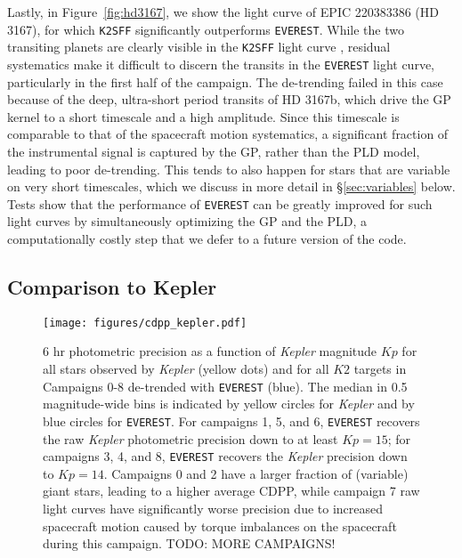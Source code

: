 \documentclass[]{emulateapj}
\newcommand{\Kp}{\ensuremath{Kp}}
\newcommand{\edited}[1]{{\color{red} #1}}
\begin{document}
\edited{Lastly, in Figure~\ref{fig:hd3167}, we show the light curve of EPIC 220383386 (HD 3167),
for which \texttt{K2SFF} significantly outperforms \texttt{EVEREST}. While the two
transiting planets are clearly visible in the \texttt{K2SFF} light curve
\citep[an ultra-short period planet at a period of 0.96 days and a planet at a period of
29.85 days;][]{Vanderburg16}, residual systematics make it difficult to discern the
transits in the \texttt{EVEREST} light curve, particularly in the first half of the
campaign. The de-trending failed in this case because of the deep, ultra-short period transits
of HD 3167b, which drive the GP kernel to a short timescale and a high amplitude. Since this
timescale is comparable to that of the spacecraft motion systematics, a significant fraction of the
instrumental signal is captured by the GP, rather than the PLD model, leading to poor
de-trending. This tends to also happen for stars that are variable on very short timescales,
which we discuss in more detail in \S\ref{sec:variables} below. Tests show that the performance
of \texttt{EVEREST} can be greatly improved for such light curves by simultaneously optimizing the
GP and the PLD, a computationally costly step that we defer to a future version of the code.}

\subsection{Comparison to Kepler}
\label{sec:kepler}

\begin{figure*}[hbt]
  \begin{center}
      \texttt{[image: figures/cdpp\_kepler.pdf]}
       \caption{6 hr photometric precision as a function of \emph{Kepler} magnitude $\Kp$ for all
       stars observed by \emph{Kepler} (yellow dots) and for all $K2$ targets in Campaigns 0-8
       de-trended with \texttt{EVEREST} (blue). The median in 0.5 magnitude-wide bins is indicated
       by yellow circles for \emph{Kepler} and by blue circles for \texttt{EVEREST}. For campaigns
       1, 5, and 6, \texttt{EVEREST} recovers the raw \emph{Kepler} photometric precision down to
       at least $\Kp = 15$; for campaigns 3, 4, and 8, \texttt{EVEREST} recovers the \emph{Kepler}
       precision down to $\Kp = 14$. Campaigns 0 and 2 have a larger fraction of (variable) giant
       stars, leading to a higher average CDPP, \edited{while campaign 7 raw light curves
       have significantly worse precision due to increased
       spacecraft motion caused by torque imbalances on the spacecraft during this campaign.
       } \edited{TODO: MORE CAMPAIGNS!}}
     \label{fig:cdpp_kepler}
  \end{center}
\end{figure*}
\end{document}
